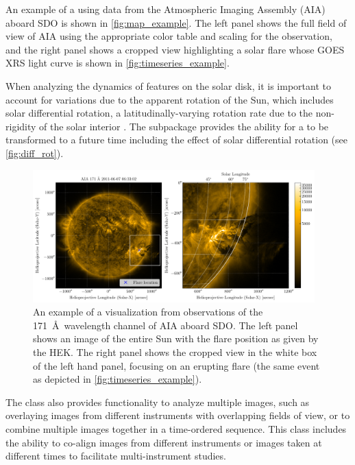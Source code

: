 An example of a \Map using data from the Atmospheric Imaging Assembly (AIA) aboard SDO is shown in \autoref{fig:map_example}.
The left panel shows the full field of view of AIA using the appropriate color table and scaling for the observation, and the right panel shows a cropped view highlighting a solar flare whose GOES XRS light curve is shown in \autoref{fig:timeseries_example}.

When analyzing the dynamics of features on the solar disk, it is important to account for variations due to the apparent rotation of the Sun, which includes solar differential rotation, a latitudinally-varying rotation rate due to the non-rigidity of the solar interior \citep[see][]{Beck2000}.
The  subpackage provides the ability for a \Map to be transformed to a future time including the effect of solar differential rotation (see \autoref{fig:diff_rot}).

\begin{figure}
    \centering
    \includegraphics[width=0.97\textwidth]{figures/map_example.pdf}
    \caption{An example of a \Map visualization from observations of the 171~\AA\ wavelength channel of AIA aboard SDO.
    The left panel shows an image of the entire Sun with the flare position as given by the HEK. The right panel shows the cropped view in the white box of the left hand panel, focusing on an erupting flare (the same event as depicted in \autoref{fig:timeseries_example}).}
    \label{fig:map_example}
\end{figure}

The \Map class also provides functionality to analyze multiple images, such as overlaying images from different instruments with overlapping fields of view, or to combine multiple images together in a time-ordered sequence.
This class includes the ability to co-align images from different instruments or images taken at different times to facilitate multi-instrument studies.


